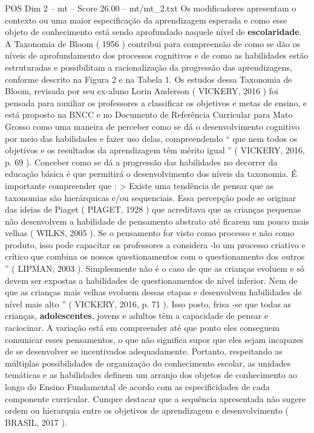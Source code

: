 \begin{textsample}{POS Dim 2 – mt – Score 26.00 – mt/mt\_2.txt}
Os modificadores apresentam o contexto ou uma maior especificação da aprendizagem esperada e como esse objeto de conhecimento está sendo aprofundado naquele nível de \textbf{escolaridade}.
A Taxonomia de Bloom ( 1956 ) contribui para compreensão de como se dão os níveis de aprofundamento dos processos cognitivos e de como as habilidades estão estruturadas e possibilitam a racionalização da progressão das aprendizagens, conforme descrito na Figura 2 e na Tabela 1.
Os estudos dessa Taxonomia de Bloom, revisada por seu ex-aluno Lorin Anderson ( VICKERY, 2016 ) foi pensada para auxiliar os professores a classificar os objetivos e metas de ensino, e está proposto na BNCC e no Documento de Referência Curricular para Mato Grosso como uma maneira de perceber como se dá o desenvolvimento cognitivo por meio das habilidades e fazer uso delas, compreendendo “ que nem todos os objetivos e os resultados da aprendizagem têm mérito igual ” ( VICKERY, 2016, p. 69 ).
Conceber como se dá a progressão das habilidades no decorrer da educação básica é que permitirá o desenvolvimento dos níveis da taxonomia.
É importante compreender que : > Existe uma tendência de pensar que as taxonomias são hierárquicas e/ou sequenciais.
Essa percepção pode se originar das ideias de Piaget ( PIAGET, 1928 ) que acreditava que as crianças pequenas não desenvolvem a habilidade de pensamento abstrato até ficarem um pouco mais velhas ( WILKS, 2005 ).
Se o pensamento for visto como processo e não como produto, isso pode capacitar os professores a considera -lo um processo criativo e crítico que combina os nossos questionamentos com o questionamento dos outros ” ( LIPMAN, 2003 ).
Simplesmente não é o caso de que as crianças evoluem e só devem ser expostas a habilidades de questionamentos de nível inferior.
Nem de que as crianças mais velhas evoluem dessas etapas e desenvolvem habilidades de nível mais alto ” ( VICKERY, 2016, p. 71 ).
Isso posto, frisa -se que todas as crianças, \textbf{adolescentes}, jovens e adultos têm a capacidade de pensar e raciocinar.
A variação está em compreender até que ponto eles conseguem comunicar esses pensamentos, o que não significa supor que eles sejam incapazes de se desenvolver se incentivados adequadamente.
Portanto, respeitando as múltiplas possibilidades de organização do conhecimento escolar, as unidades temáticas e as habilidades definem um arranjo dos objetos de conhecimento ao longo do Ensino Fundamental de acordo com as especificidades de cada componente curricular.
Cumpre destacar que a sequência apresentada não sugere ordem ou hierarquia entre os objetivos de aprendizagem e desenvolvimento ( BRASIL, 2017 ).

\end{textsample}
